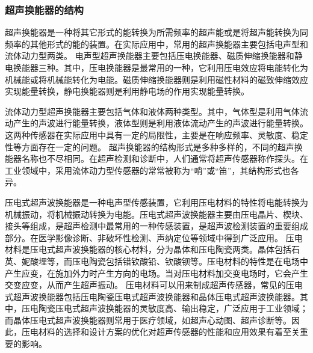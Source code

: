    \subsubsection{超声换能器的结构}
    超声换能器是一种将其它形式的能转换为所需频率的超声能或是将超声能转换为同频率的其他形式的能的装置。在实际应用中，常用的超声换能器主要包括电声型和流体动力型两类。
    电声型超声换能器主要包括压电换能器、磁质伸缩换能器和静电换能器三种。其中，压电换能器是最常用的一种，它利用压电效应将电能转化为机械能或将机械能转化为电能。磁质伸缩换能器则是利用磁性材料的磁致伸缩效应实现能量转换，静电换能器则是利用静电场的作用实现能量转换。\par
    流体动力型超声换能器主要包括气体和液体两种类型。其中，气体型是利用气体流动产生的声波进行能量转换，液体型则是利用液体流动产生的声波进行能量转换。这两种传感器在实际应用中具有一定的局限性，主要是在响应频率、灵敏度、稳定性等方面存在一定的问题。
    超声换能器的结构形式是多种多样的，不同的超声换能器名称也不尽相同。在超声检测和诊断中，人们通常将超声传感器称作探头。在工业领域中，采用流体动力型传感器的常常被称为“哨”或“笛”，其结构形式也各异。\par
    压电式超声波换能器是一种电声型传感装置，它利用压电材料的特性将电能转换为机械振动，将机械振动转换为电能。压电式超声波换能器主要由压电晶片、楔块、接头等组成，是超声检测中最常用的一种传感装置，是超声波检测装置的重要组成部分。在医学影像诊断、非破坏性检测、声纳定位等领域中得到广泛应用。
    压电材料是压电式超声波换能器的核心材料，分为晶体和压电陶瓷两类。晶体包括石英、妮酸埋等，而压电陶瓷包括错钦酸铅、钦酸钡等。压电材料的特性是在电场中产生应变，在施加外力时产生方向的电场。当对压电材料加交变电场时，它会产生交变应变，从而产生超声振动。
    压电材料可以用来制成超声传感器，常见的压电式超声波换能器包括压电陶瓷压电式超声波换能器和晶体压电式超声波换能器。其中，压电陶瓷压电式超声波换能器的灵敏度高、输出稳定，广泛应用于工业领域；而晶体压电式超声波换能器则常用于医疗领域，如超声心动图、超声诊断等。因此，压电材料的选择和设计方案的优化对超声传感器的性能和应用效果有着至关重要的影响。\par
